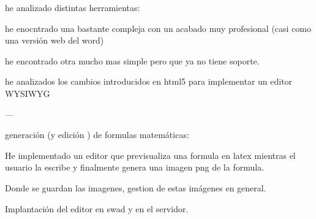 he analizado distintas herramientas:

he enocntrado una bastante compleja con un acabado muy profesional (casi como una versión web del word)

he encontrado otra mucho mas simple pero que ya no tiene soporte.

he analizados los cambios introducidos en html5 para implementar un editor WYSIWYG


---


generación (y edición ) de formulas matemáticas:

He implementado un editor que previsualiza una formula en latex mientras el usuario la escribe y finalmente genera una imagen png de la formula.

Donde se guardan las imagenes, gestion de estas imágenes en general.

Implantación del editor en swad y en el servidor. 
